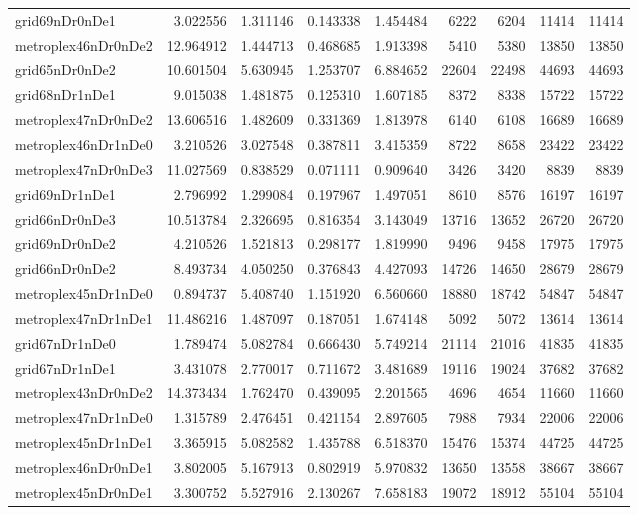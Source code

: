 \begin{longtable}{|l|r|r|r|r|r|r|r|r|}
grid69nDr0nDe1 & 3.022556 & 1.311146 & 0.143338 & 1.454484 & 6222 & 6204 & 11414 & 11414 \\
metroplex46nDr0nDe2 & 12.964912 & 1.444713 & 0.468685 & 1.913398 & 5410 & 5380 & 13850 & 13850 \\
grid65nDr0nDe2 & 10.601504 & 5.630945 & 1.253707 & 6.884652 & 22604 & 22498 & 44693 & 44693 \\
grid68nDr1nDe1 & 9.015038 & 1.481875 & 0.125310 & 1.607185 & 8372 & 8338 & 15722 & 15722 \\
metroplex47nDr0nDe2 & 13.606516 & 1.482609 & 0.331369 & 1.813978 & 6140 & 6108 & 16689 & 16689 \\
metroplex46nDr1nDe0 & 3.210526 & 3.027548 & 0.387811 & 3.415359 & 8722 & 8658 & 23422 & 23422 \\
metroplex47nDr0nDe3 & 11.027569 & 0.838529 & 0.071111 & 0.909640 & 3426 & 3420 & 8839 & 8839 \\
grid69nDr1nDe1 & 2.796992 & 1.299084 & 0.197967 & 1.497051 & 8610 & 8576 & 16197 & 16197 \\
grid66nDr0nDe3 & 10.513784 & 2.326695 & 0.816354 & 3.143049 & 13716 & 13652 & 26720 & 26720 \\
grid69nDr0nDe2 & 4.210526 & 1.521813 & 0.298177 & 1.819990 & 9496 & 9458 & 17975 & 17975 \\
grid66nDr0nDe2 & 8.493734 & 4.050250 & 0.376843 & 4.427093 & 14726 & 14650 & 28679 & 28679 \\
metroplex45nDr1nDe0 & 0.894737 & 5.408740 & 1.151920 & 6.560660 & 18880 & 18742 & 54847 & 54847 \\
metroplex47nDr1nDe1 & 11.486216 & 1.487097 & 0.187051 & 1.674148 & 5092 & 5072 & 13614 & 13614 \\
grid67nDr1nDe0 & 1.789474 & 5.082784 & 0.666430 & 5.749214 & 21114 & 21016 & 41835 & 41835 \\
grid67nDr1nDe1 & 3.431078 & 2.770017 & 0.711672 & 3.481689 & 19116 & 19024 & 37682 & 37682 \\
metroplex43nDr0nDe2 & 14.373434 & 1.762470 & 0.439095 & 2.201565 & 4696 & 4654 & 11660 & 11660 \\
metroplex47nDr1nDe0 & 1.315789 & 2.476451 & 0.421154 & 2.897605 & 7988 & 7934 & 22006 & 22006 \\
metroplex45nDr1nDe1 & 3.365915 & 5.082582 & 1.435788 & 6.518370 & 15476 & 15374 & 44725 & 44725 \\
metroplex46nDr0nDe1 & 3.802005 & 5.167913 & 0.802919 & 5.970832 & 13650 & 13558 & 38667 & 38667 \\
metroplex45nDr0nDe1 & 3.300752 & 5.527916 & 2.130267 & 7.658183 & 19072 & 18912 & 55104 & 55104 \\

\end{longtable}
